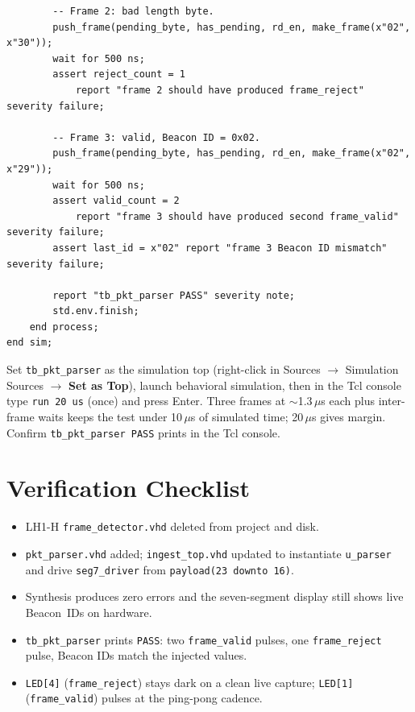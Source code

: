 \documentclass[11pt,letterpaper]{article}
\begin{document}
\begin{lstlisting}
        -- Frame 2: bad length byte.
        push_frame(pending_byte, has_pending, rd_en, make_frame(x"02", x"30"));
        wait for 500 ns;
        assert reject_count = 1
            report "frame 2 should have produced frame_reject" severity failure;

        -- Frame 3: valid, Beacon ID = 0x02.
        push_frame(pending_byte, has_pending, rd_en, make_frame(x"02", x"29"));
        wait for 500 ns;
        assert valid_count = 2
            report "frame 3 should have produced second frame_valid" severity failure;
        assert last_id = x"02" report "frame 3 Beacon ID mismatch" severity failure;

        report "tb_pkt_parser PASS" severity note;
        std.env.finish;
    end process;
end sim;
\end{lstlisting}

Set \texttt{tb\_pkt\_parser} as the simulation top (right-click in Sources $\to$ Simulation Sources $\to$ \textbf{Set as Top}), launch behavioral simulation, then in the Tcl console type \texttt{run 20 us} (once) and press Enter. Three frames at $\sim$1.3\,$\mu$s each plus inter-frame waits keeps the test under 10\,$\mu$s of simulated time; 20\,$\mu$s gives margin. Confirm \texttt{tb\_pkt\_parser PASS} prints in the Tcl console.


\section{Verification Checklist}
\begin{itemize}[leftmargin=2em]
	\item[$\square$] LH1-H \texttt{frame\_detector.vhd} deleted from project and disk.
	\item[$\square$] \texttt{pkt\_parser.vhd} added; \texttt{ingest\_top.vhd} updated to instantiate \texttt{u\_parser} and drive \texttt{seg7\_driver} from \texttt{payload(23 downto 16)}.
	\item[$\square$] Synthesis produces zero errors and the seven-segment display still shows live Beacon~IDs on hardware.
	\item[$\square$] \texttt{tb\_pkt\_parser} prints \texttt{PASS}: two \texttt{frame\_valid} pulses, one \texttt{frame\_reject} pulse, Beacon IDs match the injected values.
	\item[$\square$] \texttt{LED[4]} (\texttt{frame\_reject}) stays dark on a clean live capture; \texttt{LED[1]} (\texttt{frame\_valid}) pulses at the ping-pong cadence.
\end{itemize}
\end{document}
